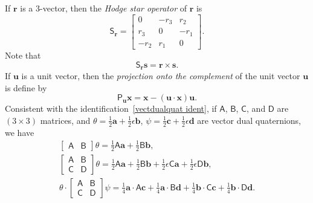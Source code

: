 \documentclass[reqno,12pt]{amsart}
\newcommand\starop[1]{\mathsf S_{#1}}
\begin{document}
If $\bm r$ is a 3-vector, then the \emph{Hodge star operator} of $\bm r$ is
\begin{equation}
\starop{\bm r} = \begin{bmatrix}  0   & - r_3 &  r_2 \\
                               r_3 &  0   & - r_1 \\
                              - r_2 &  r_1 &  0 \end{bmatrix} .
\end{equation}
Note that
\begin{equation}
\label{r star to r cross}
\starop{\bm r} \bm s = \bm r \times \bm s .
\end{equation}
If $\bm u$ is a unit vector, then the \emph{projection onto the complement} of the unit vector $\bm u$ is define by
\begin{equation}
\mathsf P_{\bm u} \bm x = \bm x - (\bm u \cdot \bm x) \bm u .
\end{equation}
Consistent with the identification~\eqref{vectdualquat ident}, if $\mathsf A$, $\mathsf B$, $\mathsf C$, and $\mathsf D$ are $(3 \times 3)$ matrices,  and $\theta = \tfrac12 \bm a + \tfrac12 \epsilon \bm b$, $\psi = \tfrac12 \bm c + \tfrac12 \epsilon \bm d$ are vector dual quaternions, we have
\begin{gather}
\begin{bmatrix}\mathsf A & \mathsf B\end{bmatrix}
\theta = \tfrac12 \mathsf A \bm a + \tfrac12 \mathsf B \bm b , \\
\begin{bmatrix}\mathsf A & \mathsf B\\
\mathsf C & \mathsf D
\end{bmatrix}
\theta =
\tfrac12 \mathsf A \bm a + \tfrac12 \mathsf B \bm b +
\tfrac12 \epsilon\mathsf C \bm a + \tfrac12 \epsilon \mathsf D \bm b, \\
\theta \cdot \begin{bmatrix}\mathsf A & \mathsf B\\
\mathsf C & \mathsf D
\end{bmatrix}
\psi =
\tfrac14 \bm a \cdot \mathsf A \bm c
+ \tfrac14 \bm a \cdot \mathsf B \bm d
+ \tfrac14 \bm b \cdot \mathsf C \bm c
+ \tfrac14 \bm b \cdot \mathsf D \bm d .
\end{gather}
\end{document}
